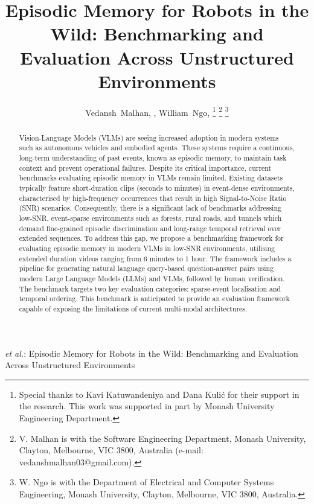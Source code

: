 \documentclass[journal]{IEEEtran}
\begin{document}
\title{Episodic Memory for Robots in the Wild: Benchmarking and Evaluation Across Unstructured Environments}

\author{Vedansh~Malhan, , William~Ngo, 
\thanks{Special thanks to Kavi Katuwandeniya and Dana Kuli\'{c} for their support in the research. This work was supported in part by Monash University Engineering Department.}
\thanks{V. Malhan is with the Software Engineering Department, Monash University, Clayton, Melbourne, VIC 3800, Australia (e-mail: vedanshmalhan03@gmail.com).}
\thanks{W. Ngo is with the Department of Electrical and Computer Systems Engineering, Monash University, Clayton, Melbourne, VIC 3800, Australia.}
}

%
{\MakeLowercase{\textit{et al.}}: Episodic Memory for Robots in the Wild: Benchmarking and Evaluation Across Unstructured Environments}

\maketitle

\begin{abstract}
Vision-Language Models (VLMs) are seeing increased adoption in modern systems such as autonomous vehicles and embodied agents. These systems require a continuous, long-term understanding of past events, known as episodic memory, to maintain task context and prevent operational failures. Despite its critical importance, current benchmarks evaluating episodic memory in VLMs remain limited. Existing datasets typically feature short-duration clips (seconds to minutes) in event-dense environments, characterised by high-frequency occurrences that result in high Signal-to-Noise Ratio (SNR) scenarios. Consequently, there is a significant lack of benchmarks addressing low-SNR, event-sparse environments such as forests, rural roads, and tunnels which demand fine-grained episodic discrimination and long-range temporal retrieval over extended sequences. To address this gap, we propose a benchmarking framework for evaluating episodic memory in modern VLMs in low-SNR environments, utilising extended duration videos ranging from 6 minutes to 1 hour. The framework includes a pipeline for generating natural language query-based question-answer pairs using modern Large Language Models (LLMs) and VLMs, followed by human verification. The benchmark targets two key evaluation categories: sparse-event localisation and temporal ordering. This benchmark is anticipated to provide an evaluation framework capable of exposing the limitations of current multi-modal architectures.
\end{abstract}
\end{document}
